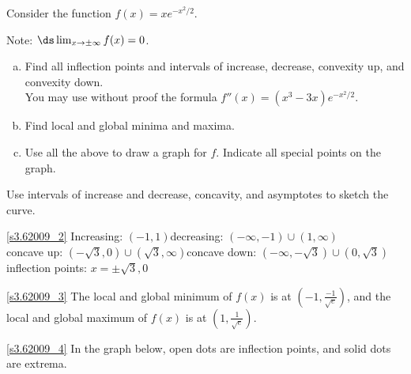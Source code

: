 \begin{Mquestion}[2009H]\label{s3.6.6explast}
Consider the function $f(x) = xe^{-x^2/2}$.

Note: $\ds\lim_{x \to \pm\infty}f(x)=0$.
\begin{enumerate}[(a)]
\item\label{s3.62009_2} Find all inflection points and intervals of increase, decrease,
 convexity up, and convexity down. \\You may use without proof the formula
$f''(x) = (x^3-3x)e^{-x^2/2}$.
\item\label{s3.62009_3} Find local and global minima and maxima.
\item\label{s3.62009_4}  Use all the above to draw a graph for $f$. Indicate all
special points on the graph.
\end{enumerate}
\end{Mquestion}
\begin{hint}
Use intervals of increase and decrease, concavity, and asymptotes to sketch the curve.
\end{hint}
\begin{answer}
\eqref{s3.62009_2}
Increasing: $(-1,1)$\qquad decreasing: $(-\infty,-1)\cup (1,\infty)$\\
concave up: $(-\sqrt{3},0) \cup (\sqrt{3},\infty)$\qquad concave down: $(-\infty,-\sqrt{3}) \cup (0 ,\sqrt{3})$\\
inflection points: $x=\pm\sqrt{3}, 0$

\eqref{s3.62009_3}
The local and global minimum of $f(x)$ is at $(-1,\frac{-1}{\sqrt{e}})$, and the local and global maximum of $f(x)$ is at $(1,\frac{1}{\sqrt{e}})$.

\eqref{s3.62009_4}
In the graph below, open dots are inflection points, and
solid dots are extrema.
\begin{center}\end{center}
\end{answer}
